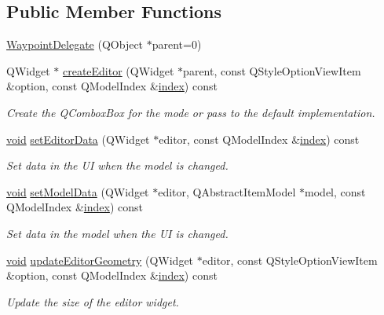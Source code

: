 \subsection*{Public Member Functions}
\begin{DoxyCompactItemize}
\item 
\hyperlink{group___path_planner_ga91775a49b804a156874199ff12e57110}{Waypoint\-Delegate} (Q\-Object $\ast$parent=0)
\item 
Q\-Widget $\ast$ \hyperlink{group___path_planner_ga8244740cc7a6bf781698edeebe341d8f}{create\-Editor} (Q\-Widget $\ast$parent, const Q\-Style\-Option\-View\-Item \&option, const Q\-Model\-Index \&\hyperlink{glext_8h_ab47dd9958bcadea08866b42bf358e95e}{index}) const 
\begin{DoxyCompactList}\small\item\em Create the Q\-Combox\-Box for the mode or pass to the default implementation. \end{DoxyCompactList}\item 
\hyperlink{group___u_a_v_objects_plugin_ga444cf2ff3f0ecbe028adce838d373f5c}{void} \hyperlink{group___path_planner_gaea8e4c0fe854e7d0ed69544eef67180a}{set\-Editor\-Data} (Q\-Widget $\ast$editor, const Q\-Model\-Index \&\hyperlink{glext_8h_ab47dd9958bcadea08866b42bf358e95e}{index}) const 
\begin{DoxyCompactList}\small\item\em Set data in the U\-I when the model is changed. \end{DoxyCompactList}\item 
\hyperlink{group___u_a_v_objects_plugin_ga444cf2ff3f0ecbe028adce838d373f5c}{void} \hyperlink{group___path_planner_gaf22bb7834577da6e336e7a52a563a89a}{set\-Model\-Data} (Q\-Widget $\ast$editor, Q\-Abstract\-Item\-Model $\ast$model, const Q\-Model\-Index \&\hyperlink{glext_8h_ab47dd9958bcadea08866b42bf358e95e}{index}) const 
\begin{DoxyCompactList}\small\item\em Set data in the model when the U\-I is changed. \end{DoxyCompactList}\item 
\hyperlink{group___u_a_v_objects_plugin_ga444cf2ff3f0ecbe028adce838d373f5c}{void} \hyperlink{group___path_planner_ga19057f741d6491a3911c76e747a3479f}{update\-Editor\-Geometry} (Q\-Widget $\ast$editor, const Q\-Style\-Option\-View\-Item \&option, const Q\-Model\-Index \&\hyperlink{glext_8h_ab47dd9958bcadea08866b42bf358e95e}{index}) const 
\begin{DoxyCompactList}\small\item\em Update the size of the editor widget. \end{DoxyCompactList}\item 

\end{DoxyCompactItemize}

